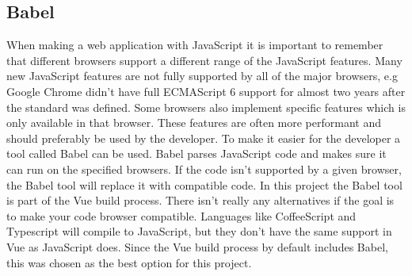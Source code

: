 \subsection{Babel}
When making a web application with JavaScript it is important to remember that different browsers support a different range of the JavaScript features. Many new JavaScript features are not fully supported by all of the major browsers, e.g Google Chrome didn't have full ECMAScript 6 support for almost two years after the standard was defined. Some browsers also implement specific features which is only available in that browser. These features are often more performant and should preferably be used by the developer. To make it easier for the developer a tool called Babel can be used. Babel parses JavaScript code and makes sure it can run on the specified browsers. If the code isn't supported by a given browser, the Babel tool will replace it with compatible code. In this project the Babel tool is part of the Vue build process. There isn't really any alternatives if the goal is to make your code browser compatible. Languages like CoffeeScript and Typescript will compile to JavaScript, but they don't have the same support in Vue as JavaScript does. Since the Vue build process by default includes Babel, this was chosen as the best option for this project.